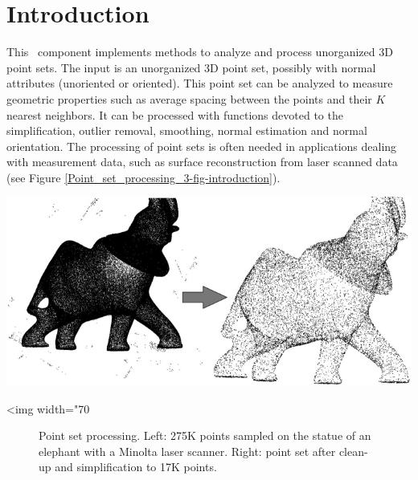 \section{Introduction}

This \cgal\ component implements methods to analyze and process unorganized 3D point sets. The input is an unorganized 3D point set, possibly with normal attributes (unoriented or oriented). This point set can be analyzed to measure geometric properties such as average spacing between the points and their $K$ nearest neighbors. It can be processed with functions devoted to the simplification, outlier removal, smoothing, normal estimation and normal orientation. The processing of point sets is often needed in applications dealing with measurement data, such as surface reconstruction from laser scanned data (see Figure \ref{Point_set_processing_3-fig-introduction}).

\begin{center}
    \label{Point_set_processing_3-fig-introduction}
    \begin{ccTexOnly}
        \includegraphics[width=1.0\textwidth]{Point_set_processing_3/introduction} %
    \end{ccTexOnly}
    \begin{ccHtmlOnly}
        <img width="70%
    \end{ccHtmlOnly}
    \begin{figure}[h]
        \caption{Point set processing.
                 Left: 275K points sampled on the statue of
                 an elephant with a Minolta laser scanner.
                 Right: point set after clean-up and
                 simplification to 17K points.}
    \end{figure}
\end{center}

